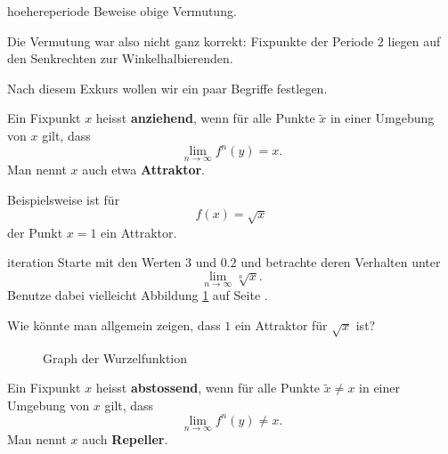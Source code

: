 \documentclass[%
<<<<<<< Updated upstream
<<<<<<< Updated upstream
11pt,%
twoside,%
titlepage,%
german,%
headsepline%
]{scrartcl}
\begin{document}
\begin{uebenv}{hoehereperiode}
Beweise obige Vermutung.
\end{uebenv}



Die Vermutung war also nicht ganz korrekt: Fixpunkte der Periode $2$ liegen auf den Senkrechten zur Winkelhalbierenden.

Nach diesem Exkurs wollen wir ein paar Begriffe festlegen.

\begin{cdef}[Attraktor]
Ein Fixpunkt $x$ heisst \textbf{anziehend}, wenn für alle Punkte $\tilde{x}$ in einer Umgebung von $x$ gilt, dass
$$\lim_{n\to\infty}f^n(y)=x.$$
Man nennt $x$ auch etwa \textbf{Attraktor}.
\end{cdef}

\begin{bsp}
Beispielsweise ist für
$$f(x)=\sqrt{x}$$
der Punkt $x=1$ ein Attraktor.
\end{bsp}


\begin{uebenv}{iteration}
Starte mit den Werten $3$ und $0.2$ und betrachte deren Verhalten unter
$$\lim_{n\to\infty}\sqrt[n]{x}.$$
Benutze dabei vielleicht Abbildung \ref{graph:wurzel} auf Seite \pageref{graph:wurzel}.

Wie könnte man allgemein zeigen, dass $1$ ein Attraktor für $\sqrt{x}$ ist?

\begin{figure}
\centering
{}
\caption{Graph der Wurzelfunktion}\label{graph:wurzel}
\end{figure}
\end{uebenv}




\begin{cdef}[Repeller]
Ein Fixpunkt $x$ heisst \textbf{abstossend}, wenn für alle Punkte $\tilde{x}\neq x$ in einer Umgebung von $x$ gilt, dass
$$\lim_{n\to\infty}f^n(y)\neq x.$$
Man nennt $x$ auch \textbf{Repeller}.
\end{cdef}
\end{document}
